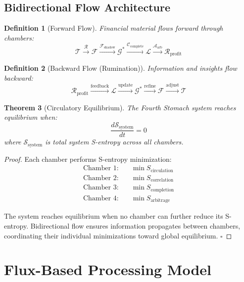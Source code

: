 \documentclass[12pt]{article}
\newtheorem{theorem}{Theorem}
\newtheorem{definition}[theorem]{Definition}
\begin{document}
\subsection{Bidirectional Flow Architecture}

\begin{definition}[Forward Flow]
Financial material flows forward through chambers:
$$
\mathcal{T} \xrightarrow{\mathcal{R}} \mathcal{F} \xrightarrow{\mathcal{F}_{\text{shadow}}} \mathcal{G}^* \xrightarrow{\mathcal{C}_{\text{complete}}} \mathcal{L} \xrightarrow{\mathcal{A}_{\text{arb}}} \mathcal{R}_{\text{profit}}
$$
\end{definition}

\begin{definition}[Backward Flow (Rumination)]
Information and insights flow backward:
$$
\mathcal{R}_{\text{profit}} \xrightarrow{\text{feedback}} \mathcal{L} \xrightarrow{\text{update}} \mathcal{G}^* \xrightarrow{\text{refine}} \mathcal{F} \xrightarrow{\text{adjust}} \mathcal{T}
$$
\end{definition}

\begin{theorem}[Circulatory Equilibrium]
The Fourth Stomach system reaches equilibrium when:
$$
\frac{d\mathcal{S}_{\text{system}}}{dt} = 0
$$
where $\mathcal{S}_{\text{system}}$ is total system S-entropy across all chambers.
\end{theorem}

\begin{proof}
Each chamber performs S-entropy minimization:
\begin{align}
\text{Chamber 1:} \quad &\min S_{\text{circulation}} \\
\text{Chamber 2:} \quad &\min S_{\text{correlation}} \\
\text{Chamber 3:} \quad &\min S_{\text{completion}} \\
\text{Chamber 4:} \quad &\min S_{\text{arbitrage}}
\end{align}

The system reaches equilibrium when no chamber can further reduce its S-entropy. Bidirectional flow ensures information propagates between chambers, coordinating their individual minimizations toward global equilibrium.
$\square$
\end{proof}

\section{Flux-Based Processing Model}
\end{document}
